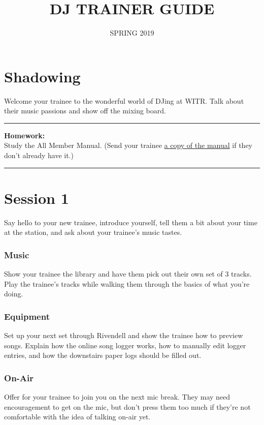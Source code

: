 \documentclass[]{witrman}
\title{DJ TRAINER GUIDE}
\date{SPRING 2019}
\newcommand{\makehomework}[1]{%
    \begin{samepage}
        \vspace{2pt}
        \rule{\textwidth}{1pt}
        \textbf{Homework:}\\
        #1\\
        \rule[3pt]{\textwidth}{1pt}
    \end{samepage}
}
\begin{document}
\maketitle

\maketoc{}

\setpagebg{}

\chapter{Shadowing}

Welcome your trainee to the wonderful world of DJing at WITR\@. Talk about their
music passions and show off the mixing board.

\makehomework{Study the All Member Manual.  (Send your trainee
\href{https://github.com/WITR-Radio/manuals/releases}{a copy of the
manual} if they don't already have it.)}


\chapter{Session 1}

Say hello to your new trainee, introduce yourself, tell them a bit about your
time at the station, and ask about your trainee's music tastes.

\subsection{Music}

Show your trainee the library and have them pick out their own set of 3 tracks.
Play the trainee's tracks while walking them through the basics of what you're
doing.

\subsection{Equipment}

Set up your next set through Rivendell and show the trainee how to preview
songs.  Explain how the online song logger works, how to manually edit logger
entries, and how the downstairs paper logs should be filled out.

\subsection{On-Air}

Offer for your trainee to join you on the next mic break.  They may need
encouragement to get on the mic, but don't press them too much if they're not
comfortable with the idea of talking on-air yet.
\end{document}
